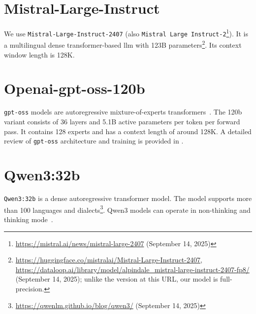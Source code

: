 \section{Mistral-Large-Instruct}

We use \texttt{Mistral-Large-Instruct-2407} (also \texttt{Mistral Large Instruct-2}\footnote{\url{https://mistral.ai/news/mistral-large-2407} (September 14, 2025)}).
It is a multilingual dense transformer-based \ac{llm} with 123B parameters\footnote{\url{https://huggingface.co/mistralai/Mistral-Large-Instruct-2407},\\ \url{https://dataloop.ai/library/model/alpindale_mistral-large-instruct-2407-fp8/} (September 14, 2025); unlike the version at this URL, our model is full-precision.}.
Its context window length is 128K.

\section{Openai-gpt-oss-120b}

\texttt{gpt-oss} models are autoregressive mixture-of-experts transformers~\citep{openai2025gptoss120bgptoss20bmodel}.
The 120b variant consists of 36 layers and 5.1B active parameters per token per forward pass.
It contains 128 experts and has a context length of around 128K.
A detailed review of \texttt{gpt-oss} architecture and training is provided in \citep{openai2025gptoss120bgptoss20bmodel}.


\section{Qwen3:32b}
\texttt{Qwen3:32b} is a dense autoregressive transformer model.
The model supports more than 100 languages and dialects\footnote{\url{https://qwenlm.github.io/blog/qwen3/} (September 14, 2025)}.
Qwen3 models can operate in non-thinking and thinking mode~\citep{qwen3_technical_report}.
